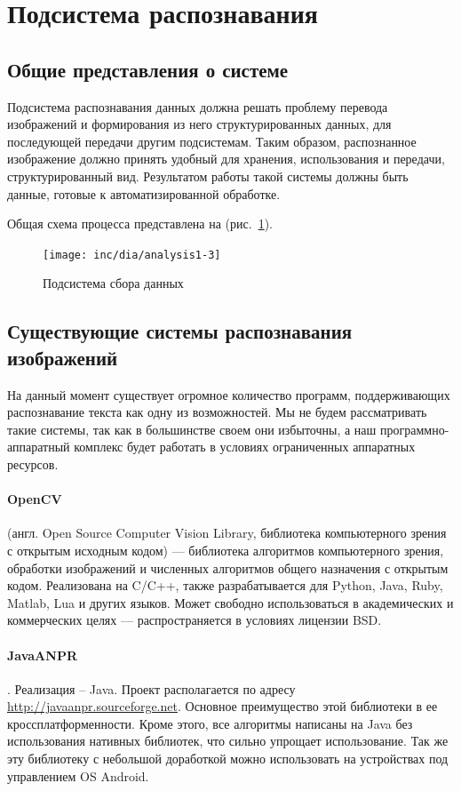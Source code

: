 \section{Подсистема распознавания}
\subsection{Общие представления о системе}

Подсистема распознавания данных должна решать проблему перевода изображений и формирования из него структурированных данных, для последующей передачи другим подсистемам. Таким образом, распознанное изображение должно принять удобный для хранения, использования и передачи, структурированный вид. Результатом работы такой системы должны быть данные, готовые к автоматизированной обработке. 

Общая схема процесса представлена на (рис.~\ref{fig:fig03}).
\begin{figure}[ht]
	\centering
	\texttt{[image: inc/dia/analysis1-3]}
	\caption{Подсистема сбора данных}
  \label{fig:fig03}
\end{figure}

\subsection{Существующие системы распознавания изображений}

На данный момент существует огромное количество программ, поддерживающих распознавание текста как одну из возможностей. Мы не будем рассматривать такие системы, так как в большинстве своем они избыточны, а наш программно-аппаратный комплекс будет работать в условиях ограниченных аппаратных ресурсов.

\paragraph{OpenCV} (англ. Open Source Computer Vision Library, библиотека компьютерного зрения с открытым исходным кодом) — библиотека алгоритмов компьютерного зрения, обработки изображений и численных алгоритмов общего назначения с открытым кодом. Реализована на C/C++, также разрабатывается для Python, Java, Ruby, Matlab, Lua и других языков. Может свободно использоваться в академических и коммерческих целях — распространяется в условиях лицензии BSD.

\paragraph{JavaANPR}. Реализация – Java. Проект располагается по адресу \url{http://javaanpr.sourceforge.net}. Основное преимущество этой библиотеки в ее кроссплатформенности. Кроме этого, все алгоритмы написаны на Java без использования нативных библиотек, что сильно упрощает использование. Так же эту библиотеку с небольшой доработкой можно использовать на устройствах под управлением OS Android.


